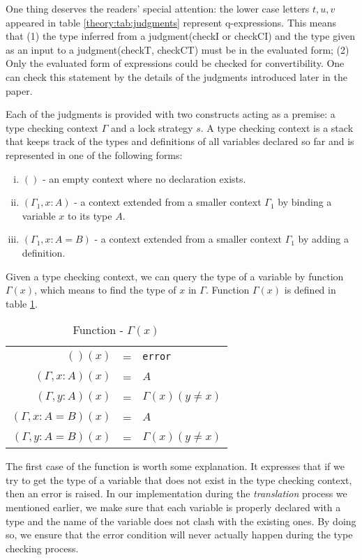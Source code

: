 One thing deserves the readers' special attention: the lower case letters $t,u,v$ appeared in table \ref{theory:tab:judgments} represent q-expressions. This means that (1) the type inferred from a judgment(checkI or checkCI) and the type given as an input to a judgment(checkT, checkCT) must be in the evaluated form; (2) Only the evaluated form of expressions could be checked for convertibility. One can check this statement by the details of the judgments introduced later in the paper.

Each of the judgments is provided with two constructs acting as a premise: a type checking context $\Gamma$ and a lock strategy $s$. A type checking context is a stack that keeps track of the types and definitions of all variables declared so far and is represented in one of the following forms:
\begin{definition}
  \leavevmode \vspace{-\baselineskip}
  \begin{enumerate}[(i)]
  \item $()$ - an empty context where no declaration exists.
  \item $(\Gamma_1, x : A)$ - a context extended from a smaller context $\Gamma_1$ by binding a variable $x$ to its type $A$.
  \item $(\Gamma_1, x : A = B)$ - a context extended from a smaller context $\Gamma_1$ by adding a definition.
  \end{enumerate}
\end{definition}

Given a type checking context, we can query the type of a variable by function $\Gamma(x)$, which means to find the type of $x$ in $\Gamma$. Function $\Gamma(x)$ is defined in table \ref{theory:tab:gamma}.
\begin{table}[h]
  \centering
  \begin{tabular}{r l l}
    $()(x)$ & = & \texttt{error} \\
    $(\Gamma, x : A)(x)$ & = & $A$ \\
    $(\Gamma, y : A)(x)$ & = & $\Gamma(x)(y \neq x)$ \\
    $(\Gamma, x : A = B)(x)$ & = & $A$ \\
    $(\Gamma, y : A = B)(x)$ & = & $\Gamma(x)(y \neq x)$
  \end{tabular}
  \caption{Function - $\Gamma(x)$}
  \label{theory:tab:gamma}
\end{table}

The first case of the function is worth some explanation. It expresses that if we try to get the type of a variable that does not exist in the type checking context, then an error is raised. In our implementation during the \emph{translation} process we mentioned earlier, we make sure that each variable is properly declared with a type and the name of the variable does not clash with the existing ones. By doing so, we ensure that the error condition will never actually happen during the type checking process.

